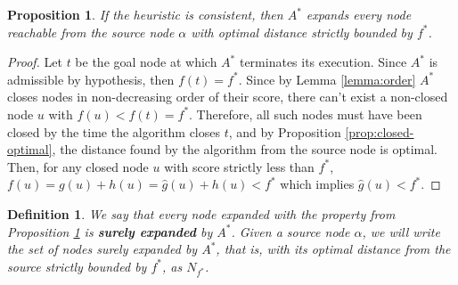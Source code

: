 \documentclass[12pt]{report}
\newtheorem{definition}[theorem]{Definition}
\newtheorem{proposition}[theorem]{Proposition}
\begin{document}
\begin{proposition}
\label{prop:surely}
If the heuristic is consistent, then $A^*$ expands every node reachable from the source node $\alpha$ with optimal distance strictly bounded by $f^*$.
\end{proposition}
\begin{proof}
Let $t$ be the goal node at which $A^*$ terminates its execution. Since $A^*$ is admissible by hypothesis, then $f(t) = f^*$. Since by Lemma \ref{lemma:order} $A^*$ closes nodes in non-decreasing order of their score, there can't exist a non-closed node $u$ with $f(u) < f(t) = f^*$. Therefore, all such nodes must have been closed by the time the algorithm closes $t$, and by Proposition \ref{prop:closed-optimal}, the distance found by the algorithm from the source node is optimal. Then, for any closed node $u$ with score strictly less than $f^*$, $f(u) = g(u) + h(u) = \hat{g}(u) + h(u) < f^*$ which implies $\hat{g}(u) < f^*$.
\end{proof}

\begin{definition}
We say that every node expanded with the property from Proposition \ref{prop:surely} is \textbf{surely expanded} by $A^*$. Given a source node $\alpha$, we will write the set of nodes surely expanded by $A^*$, that is, with its optimal distance from the source strictly bounded by $f^*$, as $N_{f^*}$.
\end{definition}
\end{document}
